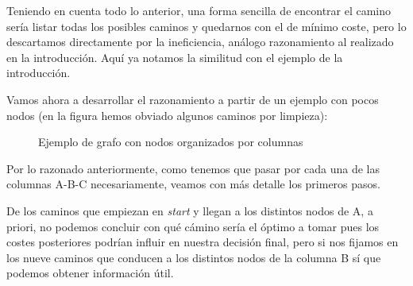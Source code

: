\documentclass{article}
\begin{document}
Teniendo en cuenta todo lo anterior, una forma sencilla de encontrar el camino sería 
listar todas los posibles caminos y quedarnos con el de mínimo coste, pero lo descartamos 
directamente por la ineficiencia, análogo razonamiento 
al realizado en la introducción. Aquí ya notamos la similitud con el ejemplo de la introducción. 

Vamos ahora a desarrollar el razonamiento a partir de un ejemplo con pocos nodos (en la figura hemos
obviado algunos caminos por limpieza): 

\begin{figure}[!hbt]
    \centering
    \caption{Ejemplo de grafo con nodos organizados por columnas}
\end{figure}

Por lo razonado anteriormente, como tenemos que pasar por cada una de las columnas A-B-C necesariamente, veamos con más detalle 
los primeros pasos.

De los caminos que empiezan en \textit{start} y llegan a los distintos nodos de A, a priori, no podemos concluir con qué 
cámino sería el óptimo a tomar pues los costes posteriores podrían influir en nuestra decisión final, 
pero si nos fijamos en los nueve caminos que conducen a los distintos nodos de la
columna B sí que podemos obtener información útil. 
\end{document}
